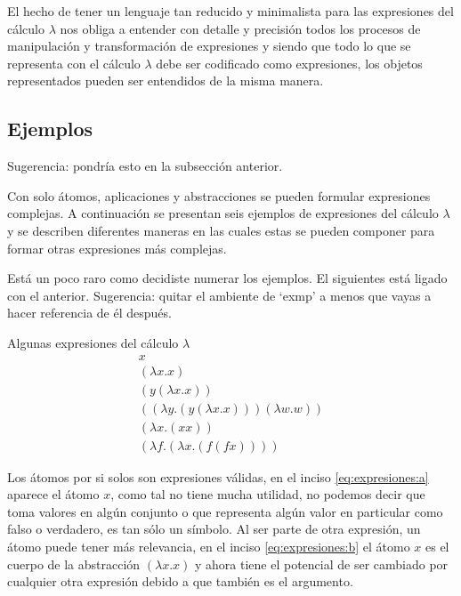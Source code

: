 El hecho de tener un lenguaje tan reducido y minimalista para las expresiones del cálculo \( λ \) nos obliga a entender con detalle y precisión todos los procesos de manipulación y transformación de expresiones y siendo que todo lo que se representa con el cálculo \( λ \) debe ser codificado como expresiones, los objetos representados pueden ser entendidos de la misma manera.


\subsection{Ejemplos}
\label{sec:ejemplos}

\begin{Gutu}
Sugerencia: pondría esto en la subsección anterior. 
\end{Gutu}
Con solo átomos, aplicaciones y abstracciones se pueden formular expresiones complejas. A continuación se presentan seis ejemplos de expresiones del cálculo \( λ \) y se describen diferentes maneras en las cuales estas se pueden componer para formar otras expresiones más complejas.

\begin{Gutu}
Está un poco raro como decidiste numerar los ejemplos. El siguientes está ligado con el anterior. Sugerencia: quitar el ambiente de `exmp' a menos que vayas a hacer referencia de él después.
\end{Gutu}

\begin{exmp}
  Algunas expresiones del cálculo \( λ \)
  \label{exmp:expresiones}
  \begin{subequations}
    \begin{gather}
      \label{eq:expresiones:a} \tag{a}
      x \\
      \label{eq:expresiones:b} \tag{b}
      (λx.x) \\
      \label{eq:expresiones:c} \tag{c}
      (y(λx.x)) \\
      \label{eq:expresiones:d} \tag{d}
      ((λy.(y(λx.x)))(λw.w)) \\
      \label{eq:expresiones:e} \tag{e}
      (λx.(x x)) \\
      \label{eq:expresiones:f} \tag{f}
      (λf.(λx.(f(f x))))
    \end{gather}
  \end{subequations}
\end{exmp}


Los átomos por si solos son expresiones válidas, en el inciso \eqref{eq:expresiones:a} aparece el átomo \( x \), como tal no tiene mucha utilidad, no podemos decir que toma valores en algún conjunto o que representa algún valor en particular como falso o verdadero, es tan sólo un símbolo. Al ser parte de otra expresión, un átomo puede tener más relevancia, en el inciso \eqref{eq:expresiones:b} el átomo \( x \) es el cuerpo de la abstracción \( (λx.x) \) y ahora tiene el potencial de ser cambiado por cualquier otra expresión debido a que también es el argumento.

